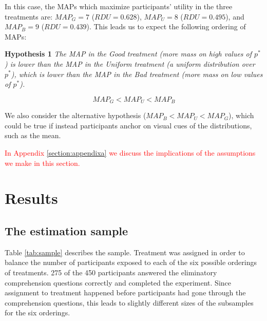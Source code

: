 In this case, the MAPs which maximize participants' utility in the three treatments are: $MAP_G = 7$ ($RDU = 0.628$), $MAP_U = 8$ ($RDU = 0.495$), and $MAP_B = 9$ ($RDU = 0.439$).
This leads us to expect the following ordering of MAPs:

\noindent \textbf{Hypothesis 1} \quad \textit{The MAP in the Good treatment (more mass on high values of $p^*$) is lower than the MAP in the Uniform treatment (a uniform distribution over $p^*$), which is lower than the MAP in the Bad treatment (more mass on low values of $p^*$).}

\begin{equation}
MAP_G < MAP_U < MAP_B
\end{equation}

We also consider the alternative hypothesis ($MAP_B < MAP_U < MAP_G$), which could be true if instead participants anchor on visual cues of the distributions, such as the mean.

\textcolor{red}{In Appendix \ref{section:appendixa} we discuss the implications of the assumptions we make in this section.}

\section{Results}\label{sec:results}
\subsection{The estimation sample}\label{ssec:sample}

Table \ref{tab:sample} describes the sample.
Treatment was assigned in order to balance the number of participants exposed to each of the six possible orderings of treatments.
275 of the 450 participants answered the eliminatory comprehension questions correctly and completed the experiment.
Since assignment to treatment happened before participants had gone through the comprehension questions, this leads to slightly different sizes of the subsamples for the six orderings.

